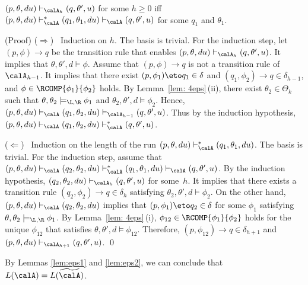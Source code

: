 
\begin{lemma}\label{lem:eps2}
$(p,\theta,du)\vdash_{\calA_h} (q,\theta',u)$
for some $h\ge0$
iff
$(p,\theta,du)\vdash_{\calA}^* (q_1,\theta_1,du)
\vdash_{\calA} (q,\theta',u)$
for some $q_1$ and $\theta_1$.
\end{lemma}
%
(Proof)\quad
($\Rightarrow$) \ Induction on $h$.
The basis is trivial.
For the induction step,
let $(p,\phi)\to q$ be the transition rule
that enables
$(p,\theta,du)\vdash_{\calA_h} (q,\theta',u)$.
It implies that $\theta,\theta',d\models\phi$.
Assume that $(p,\phi)\to q$ is
not a transition rule of $\calA_{h-1}$.
It implies that
there exist ${(p,\phi_1)\eto q_1}\in\delta$ and
${(q_1,\phi_2)\to q}\in\delta_{h-1}$, and
$\phi\in\RCOMP{\phi_1}{\phi_2}$ holds.
By Lemma~\ref{lem: 4eps}\,(ii),
there exist $\theta_2\in\Theta_k$ such that
$\theta,\theta_2\models_{\L,\R} \phi_1$
and $\theta_2,\theta',d\models \phi_2$.
Hence,
$(p,\theta,du)\vdash_{\calA} (q_1,\theta_2,du)
\vdash_{\calA_{h-1}} (q,\theta',u)$.
Thus by the induction hypothesis,
$(p,\theta,du)\vdash_{\calA} (q_1,\theta_2,du)
\vdash_{\calA}^* (q,\theta',u)$.

($\Leftarrow$) \
Induction on the length of the run
$(p,\theta,du)\vdash_{\calA}^* (q_1,\theta_1,du)$.
The basis is trivial.
For the induction step, assume that
$(p,\theta,du)\vdash_{\calA}(q_2,\theta_2,du)
\vdash_{\calA}^* (q_1,\theta_1,du)
\vdash_{\calA} (q,\theta',u)$.
By the induction hypothesis,
$(q_2,\theta_2,du)\vdash_{\calA_h} (q,\theta',u)$
for some~$h$.
It implies that
there exists a transition rule
${(q_2,\phi_2)\to q}\in\delta_{h}$ satisfying
$\theta_2,\theta',d\models\phi_2$.
On the other hand,
$(p,\theta,du)\vdash_{\calA}(q_2,\theta_2,du)$
implies that
${(p,\phi_1)\eto q_2}\in\delta$ for some $\phi_1$
satisfying $\theta,\theta_2\models_{\L,\R}\phi_1$.
By Lemma~\ref{lem: 4eps}\,(i),
$\phi_{12}\in\RCOMP{\phi_1}{\phi_2}$ holds for the unique
$\phi_{12}$ that satisfies $\theta,\theta',d\models\phi_{12}$.
Therefore,
${(p,\phi_{12})\to q}\in\delta_{h+1}$ and
$(p,\theta,du)\vdash_{\calA_{h+1}} (q,\theta',u)$.
\qed

\medskip
By Lemmas \ref{lem:eps1} and \ref{lem:eps2},
we can conclude that $L(\calA)=L(\widetilde{\calA})$.



%
